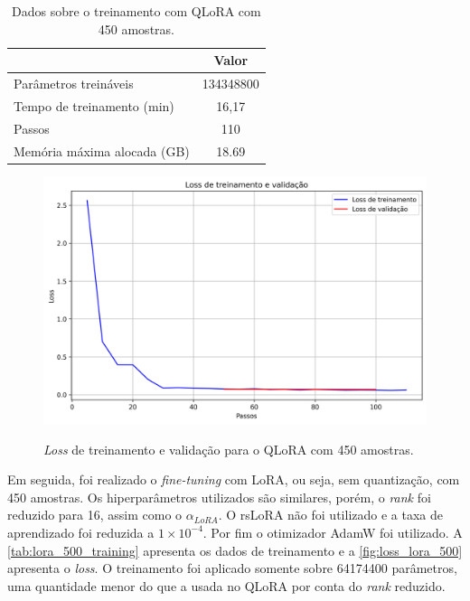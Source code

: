 \begin{table}[ht]
    \caption{\small Dados sobre o treinamento com \ac{QLoRA} com 450 amostras.}
    \centering
    \begin{tabular}{l|c}
        \hline
                                    & Valor     \\ \hline
        Parâmetros treináveis       & 134348800 \\
        Tempo de treinamento (min)  & 16,17     \\
        Passos                      & 110       \\
        Memória máxima alocada (GB) & 18.69     \\ \hline
    \end{tabular}
    \label{tab:qlora_500_training}
\end{table}

\begin{figure}[ht]
    \centering
    \caption{\small \textit{Loss} de treinamento e validação para o \ac{QLoRA} com 450 amostras.}
    \includegraphics[width=0.8\columnwidth,keepaspectratio]{images/loss_qlora_500.png}
    \label{fig:loss_qlora_500}
\end{figure}

Em seguida, foi realizado o \textit{fine-tuning} com \ac{LoRA}, ou seja, sem quantização, com 450 amostras. Os
hiperparâmetros utilizados são similares, porém, o \textit{rank} foi reduzido para 16, assim como o \begin{math}\alpha_{LoRA}\end{math}. O \ac{rsLoRA} não foi utilizado e a taxa de aprendizado foi reduzida a
\begin{math}1 \times 10^{-4}\end{math}. Por fim o otimizador \ac{AdamW} foi utilizado. A \autoref{tab:lora_500_training} apresenta os dados de treinamento e a
\autoref{fig:loss_lora_500} apresenta o \textit{loss}. O treinamento foi aplicado somente sobre 64174400 parâmetros, uma quantidade menor do que a usada no
\ac{QLoRA} por conta do \textit{rank} reduzido.

